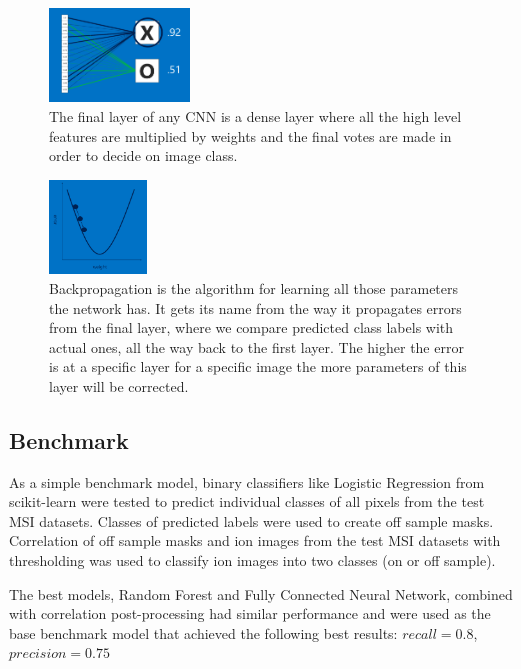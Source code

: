 \documentclass[a4paper]{article}
\begin{document}
    \begin{figure}[H]
        \centering
            \includegraphics[width=\textwidth,height=2.5cm,keepaspectratio]{cnn13.png}
        \caption{The final layer of any CNN is a dense layer where all the high level features are multiplied
        by weights and the final votes are made in order to decide on image class.}
    \end{figure}
    
    \begin{figure}[H]
        \centering
            \includegraphics[width=\textwidth,height=2.5cm,keepaspectratio]{cnn15.png}
        \caption{Backpropagation is the algorithm for learning all those parameters the network has.
        It gets its name from the way it propagates errors from the final layer, where we compare predicted
        class labels with actual ones, all the way back to the first layer. The higher the error is at
        a specific layer for a specific image the more parameters of this layer will be corrected.}
    \end{figure}
    
    
    
    \newpage
    \subsection*{Benchmark}
    
    As a simple benchmark model, binary classifiers like Logistic Regression from scikit-learn were
    tested to predict individual classes of all pixels from the test MSI datasets.
    Classes of predicted labels were used to create off sample masks.
    Correlation of off sample masks and ion images from the test MSI datasets
    with thresholding was used to classify ion images into two classes (on or off sample).
    
    The best models, Random Forest and Fully Connected Neural Network, combined with correlation post-processing
    had similar performance and were used as the base benchmark model that achieved the following best results:
    $recall=0.8$, $precision=0.75$
    
\end{document}

